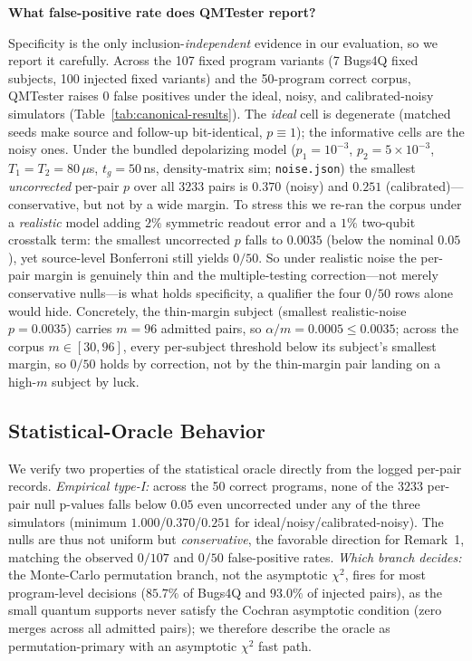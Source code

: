 \noindent\textbf{What false-positive rate does QMTester report?}

Specificity is the only inclusion-\emph{independent} evidence in our evaluation, so we report it carefully. Across the 107 fixed program variants (7 Bugs4Q fixed subjects, 100 injected fixed variants) and the 50-program correct corpus, QMTester raises $0$ false positives under the ideal, noisy, and calibrated-noisy simulators (Table~\ref{tab:canonical-results}). The \emph{ideal} cell is degenerate (matched seeds make source and follow-up bit-identical, $p\equiv 1$); the informative cells are the noisy ones. Under the bundled depolarizing model ($p_1{=}10^{-3}$, $p_2{=}5{\times}10^{-3}$, $T_1{=}T_2{=}80\,\mu$s, $t_g{=}50$\,ns, density-matrix sim; \texttt{noise.json}) the smallest \emph{uncorrected} per-pair $p$ over all $3233$ pairs is $0.370$ (noisy) and $0.251$ (calibrated)---conservative, but not by a wide margin. To stress this we re-ran the corpus under a \emph{realistic} model adding $2\%$ symmetric readout error and a $1\%$ two-qubit crosstalk term: the smallest uncorrected $p$ falls to $0.0035$ (below the nominal $0.05$), yet source-level Bonferroni still yields $0/50$. So under realistic noise the per-pair margin is genuinely thin and the multiple-testing correction---not merely conservative nulls---is what holds specificity, a qualifier the four $0/50$ rows alone would hide. Concretely, the thin-margin subject (smallest realistic-noise $p=0.0035$) carries $m=96$ admitted pairs, so $\alpha/m=0.0005\le0.0035$; across the corpus $m\in[30,96]$, every per-subject threshold below its subject's smallest margin, so $0/50$ holds by correction, not by the thin-margin pair landing on a high-$m$ subject by luck.

\subsection{Statistical-Oracle Behavior}
\label{sec:oracle-behavior}

We verify two properties of the statistical oracle directly from the logged per-pair records. \emph{Empirical type-I:} across the 50 correct programs, none of the $3233$ per-pair null p-values falls below $0.05$ even uncorrected under any of the three simulators (minimum $1.000$/$0.370$/$0.251$ for ideal/noisy/calibrated-noisy). The nulls are thus not uniform but \emph{conservative}, the favorable direction for Remark~1, matching the observed $0/107$ and $0/50$ false-positive rates. \emph{Which branch decides:} the Monte-Carlo permutation branch, not the asymptotic $\chi^2$, fires for most program-level decisions ($85.7\%$ of Bugs4Q and $93.0\%$ of injected pairs), as the small quantum supports never satisfy the Cochran asymptotic condition (zero merges across all admitted pairs); we therefore describe the oracle as permutation-primary with an asymptotic $\chi^2$ fast path.

